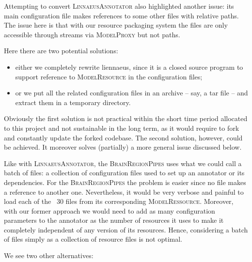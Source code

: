 \documentclass{article}
\newcommand{\id}[1]{\mbox{\textsc{#1}}}
\begin{document}
Attempting to convert \id{LinnaeusAnnotator} also highlighted another issue: its main configuration file makes references to some other files with relative paths. The issue here is that with our resource packaging system the files are only accessible through streams via \id{ModelProxy} but not paths.

Here there are two potential solutions:

\begin{itemize}

\item either we completely rewrite liennaeus, since it is a closed source program to support reference to \id{ModelResource} in the configuration files;

\item or we put all the related configuration files in an archive -- say, a tar file -- and extract them in a temporary directory.

\end{itemize}

Obviously the first solution is not practical within the short time period allocated to this project and not sustainable in the long term, as it would require to fork and constantly update the forked codebase. The second solution, however, could be achieved. It moreover solves (partially) a more general issue discussed below.

Like with \id{LinnaeusAnnotator}, the \id{BrainRegionPipes} uses what we could call a batch of files: a collection of configuration files used to set up an annotator or its dependencies. For the \id{BrainRegionPipes} the problem is easier since no file makes a reference to another one. Nevertheless, it would be very verbose and painful to load each of the ~30 files from its corresponding \id{ModelRessource}. Moreover, with our former approach we would need to add as many configuration parameters to the annotator as the number of resources it uses to make it completely independent of any version of its resources. Hence, considering a batch of files simply as a collection of resource files is not optimal.

We see two other alternatives:
\end{document}
